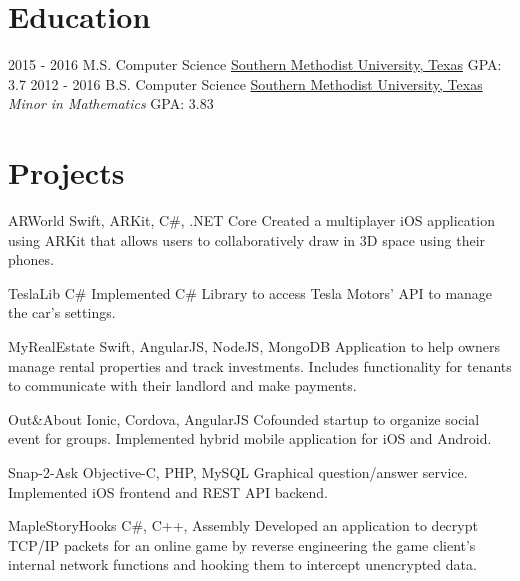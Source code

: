 \documentclass[letterpaper]{resume}
\begin{document}
\section{Education}
\begin{twenty}
	\twentyitem
	{2015 - 2016}
	{}
	{M.S. Computer Science }
	{\href{http://www.smu.edu/}{Southern Methodist University, Texas}}
	{GPA: 3.7}
	{}
	\twentyitem
	{2012 - 2016}
	{}
	{B.S. Computer Science }
	{\href{http://www.smu.edu/}{Southern Methodist University, Texas}}
	{\emph{Minor in Mathematics}}
	{GPA: 3.83}
\end{twenty}


\section{Projects}

\project
{ARWorld}
{Swift, ARKit, C\#, .NET Core}
{Created a multiplayer iOS application using ARKit that allows users to collaboratively draw in 3D space using their phones.}

\project
{TeslaLib}
{C\#}
{Implemented C\# Library to access Tesla Motors’ API to manage the car’s settings.}

\project
{MyRealEstate}
{Swift, AngularJS, NodeJS, MongoDB}
{Application to help owners manage rental properties and track investments. Includes functionality for tenants to communicate with their landlord and make payments.}

\project
{Out\&About}
{Ionic, Cordova, AngularJS}
{Cofounded startup to organize social event for groups. Implemented hybrid mobile application for iOS and Android.}

\project
{Snap-2-Ask}
{Objective-C, PHP, MySQL}
{Graphical question/answer service. Implemented iOS frontend and REST API backend.}

\project
{MapleStoryHooks}
{C\#, C++, Assembly}
{Developed an application to decrypt TCP/IP packets for an online game by reverse engineering the game client’s internal network functions and hooking them to intercept unencrypted data.}
		
\end{document}
